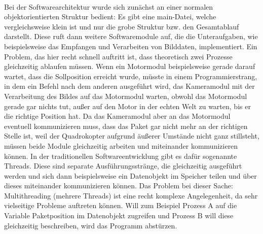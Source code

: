 \paragraph{}
Bei der Softwarearchitektur wurde sich zunächst an einer normalen
objektorientierten Struktur bedient: Es gibt eine main-Datei, welche vergleichsweise
klein ist und nur die grobe Struktur bzw. den Gesamtablauf darstellt. Diese ruft dann
weitere Softwaremodule auf, die die Unteraufgaben, wie beispielsweise das
Empfangen und Verarbeiten von Bilddaten, implementiert. Ein Problem, das hier recht
schnell auftritt ist, dass theoretisch zwei Prozesse gleichzeitig ablaufen müssen. Wenn
ein Motormodul beispielsweise gerade darauf wartet, dass die Sollposition erreicht
wurde, müsste in einem Programmierstrang, in dem ein Befehl nach dem anderen
ausgeführt wird, das Kameramodul mit der Verarbeitung des Bildes auf das
Motormodul warten, obwohl das Motormodul gerade gar nichts tut, außer auf den
Motor in der echten Welt zu warten, bis er die richtige Position hat. Da das
Kameramodul aber an das Motormodul eventuell kommunizieren muss, dass das
Paket gar nicht mehr an der richtigen Stelle ist, weil der Quadrokopter aufgrund
äußerer Umstände nicht ganz stillsteht, müssen beide Module gleichzeitig arbeiten und
miteinander kommunizieren können. In der traditionellen Softwareentwicklung gibt es
dafür sogenannte Threads. Diese sind separate Ausführungsstränge, die gleichzeitig
ausgeführt werden und sich dann beispielsweise ein Datenobjekt im Speicher teilen
und über dieses miteinander kommunizieren können. Das Problem bei dieser Sache:
Multithreading (mehrere Threads) ist eine recht komplexe Angelegenheit, da sehr
vielseitige Probleme auftreten können. Will zum Beispiel Prozess A auf die Variable
Paketposition im Datenobjekt zugreifen und Prozess B will diese gleichzeitig
beschreiben, wird das Programm abstürzen.
